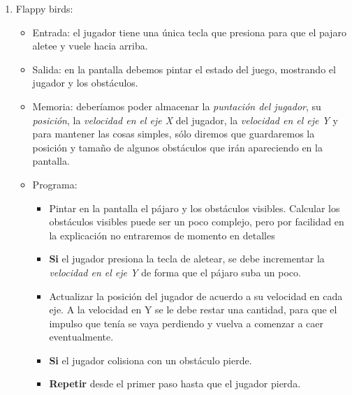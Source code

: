 \begin{Answer}
\begin{enumerate}
\item Flappy birds:
	\begin{itemize}
		\item Entrada: el jugador tiene una única tecla que presiona para que el pajaro aletee y vuele hacia arriba.
		\item Salida: en la pantalla debemos pintar el estado del juego, mostrando el jugador y los obstáculos.
		\item Memoria: deberíamos poder almacenar la \emph{puntación del jugador}, su \emph{posición}, la \emph{velocidad en el eje X} del jugador, la \emph{velocidad en el eje Y} y para mantener las cosas simples, sólo diremos que guardaremos la posición y tamaño de algunos obstáculos que irán apareciendo en la pantalla.
		\item Programa:
		\begin{itemize}
			\item Pintar en la pantalla el pájaro y los obstáculos visibles. Calcular los obstáculos visibles puede ser un poco complejo, pero por facilidad en la explicación no entraremos de momento en detalles		
			\item \textbf{Si} el jugador presiona la tecla de aletear, se debe incrementar la \emph{velocidad en el eje Y} de forma que el pájaro suba un poco.					
			\item Actualizar la posición del jugador de acuerdo a su velocidad en cada eje. A la velocidad en Y se le debe restar una cantidad, para que el impulso que tenía se vaya perdiendo y vuelva a comenzar a caer eventualmente.
			\item \textbf{Si} el jugador colisiona con un obstáculo pierde.
			\item \textbf{Repetir} desde el primer paso hasta que el jugador pierda.
		\end{itemize}
		
	\end{itemize}
\end{enumerate}
\newpage
\end{Answer}

\newpage
